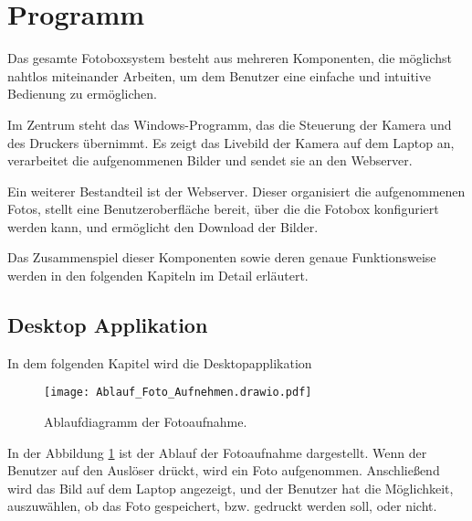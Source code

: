 \graphicspath{{images/program}}

\section{Programm}


Das gesamte Fotoboxsystem besteht aus mehreren Komponenten, die möglichst nahtlos
miteinander Arbeiten, um dem Benutzer eine einfache und intuitive Bedienung
zu ermöglichen. 

Im Zentrum steht das Windows-Programm, das die Steuerung der Kamera und des
Druckers übernimmt. Es zeigt das Livebild der Kamera auf dem Laptop an,
verarbeitet die aufgenommenen Bilder und sendet sie an den Webserver.

Ein weiterer Bestandteil ist der Webserver. Dieser organisiert die
aufgenommenen Fotos, stellt eine Benutzeroberfläche bereit, über die die Fotobox
konfiguriert werden kann, und ermöglicht den Download der Bilder.

Das Zusammenspiel dieser Komponenten sowie deren genaue Funktionsweise werden
in den folgenden Kapiteln im Detail erläutert.

\newpage

\subsection{Desktop Applikation}

In dem folgenden Kapitel wird die Desktopapplikation 

\begin{figure}[H]
    \centering
    \texttt{[image: Ablauf\_Foto\_Aufnehmen.drawio.pdf]}
    \caption{Ablaufdiagramm der Fotoaufnahme.}
    \label{fig:Ablauf_Foto_Aufnehmen}
\end{figure}

In der Abbildung \ref{fig:Ablauf_Foto_Aufnehmen} ist der Ablauf der Fotoaufnahme dargestellt.
Wenn der Benutzer auf den Auslöser drückt, wird ein Foto aufgenommen.
Anschließend wird das Bild auf dem Laptop angezeigt, und der Benutzer hat die Möglichkeit,
auszuwählen, ob das Foto gespeichert, bzw. gedruckt werden soll, oder nicht.